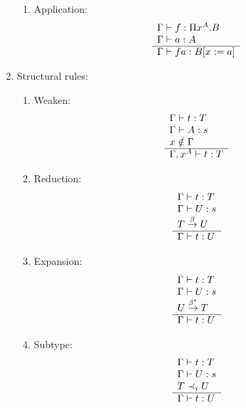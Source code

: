 \begin{definition}
\begin{enumerate}
\begin{enumerate}
        \item Application:
            $$
            \begin{array}{l} 
                \Gamma \vdash f: \Pi x^A. B
                \\
                \Gamma \vdash a: A
             \\ \hline 
                \Gamma \vdash f a: B[x:=a]
            \end{array}
            $$
    \end{enumerate}


    \item Structural rules:
        \begin{enumerate}
            \item Weaken:
                $$
                \begin{array}{l} 
                    \Gamma \vdash t: T
                    \\
                    \Gamma \vdash A: s
                    \\
                    x \notin \Gamma
                 \\ \hline 
                    \Gamma, x^A \vdash t: T
                \end{array}
                $$

            \item Reduction:
                $$
                \begin{array}{l} 
                    \Gamma \vdash t: T
                    \\
                    \Gamma \vdash U: s
                    \\
                    T \stackrel{\beta}{\to} U
                 \\ \hline 
                    \Gamma \vdash t: U
                \end{array}
                $$

            \item Expansion:
                $$
                \begin{array}{l} 
                    \Gamma \vdash t: T
                    \\
                    \Gamma \vdash U: s
                    \\
                    U \stackrel{\beta^*}{\to} T
                 \\ \hline 
                    \Gamma \vdash t: U
                \end{array}
                $$

            \item Subtype:
                $$
                \begin{array}{l} 
                    \Gamma \vdash t: T
                    \\
                    \Gamma \vdash U: s
                    \\
                    T \prec_i U
                 \\ \hline 
                    \Gamma \vdash t: U
                \end{array}
                $$
        \end{enumerate}
    \end{enumerate}
\end{definition}




